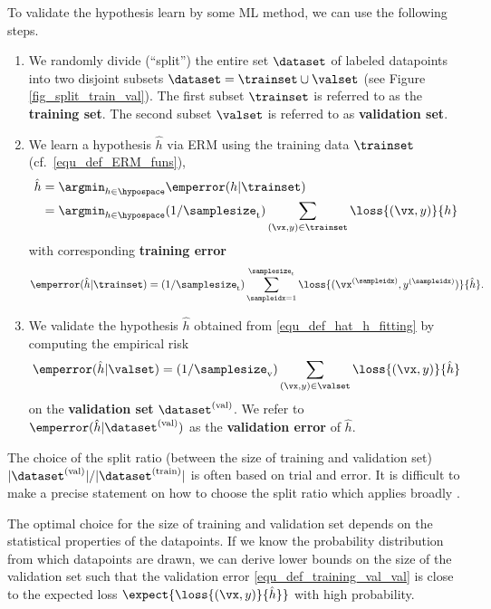 \documentclass[12pt]{report}
\begin{document}
To validate the hypothesis learn by some ML method, we can use the 
following steps. 
\begin{enumerate} 
\item We randomly divide (``split'') the entire set $\dataset$ of labeled datapoints into 
two disjoint subsets $\dataset = \trainset \cup \valset$ (see Figure \ref{fig_split_train_val}). 
The first subset $\trainset$ is referred to as the {\bf training set}. The second subset $\valset$ 
is referred to as {\bf validation set}.  
\item We learn a hypothesis $\hat{h}$ via ERM using the training data $\trainset$ (cf.\ \eqref{equ_def_ERM_funs}), 
\begin{align} 
\label{equ_def_hat_h_fitting}
\hat{h} & = \argmin_{h \in \hypospace} \emperror(h| \trainset) \nonumber \\
& = \argmin_{h \in \hypospace}  (1/\samplesize_{\rm t}) \sum_{(\vx,y) \in \trainset} \loss{(\vx,y)}{h} %
\end{align} 
with corresponding {\bf training error} 
\begin{equation} 
\label{equ_def_training_error_val}
\emperror(\hat{h}|\trainset)=  (1/\samplesize_{\rm t}) \sum_{\sampleidx=1}^{\samplesize_{\rm t}} \loss{(\vx^{(\sampleidx)},y^{(\sampleidx)})} {\hat{h}}.  %
\end{equation}  
\item We validate the hypothesis $\hat{h}$ obtained from \eqref{equ_def_hat_h_fitting} by computing the empirical risk 
\begin{equation} 
\label{equ_def_training_val_val}
\emperror(\hat{h}|\valset) = (1/\samplesize_{\rm v})  \sum_{(\vx,y) \in \valset} \loss{(\vx,y)} {\hat{h}}  %
\end{equation}  
on the {\bf validation set} $\dataset^{(\rm val)}$. We refer to $\emperror(\hat{h}| \dataset^{(\rm val)})$ 
as the {\bf validation error} of $\hat{h}$. 
\end{enumerate} 
The choice of the split ratio (between the size of training and validation set) $|\dataset^{(\rm val)}| / |\dataset^{(\rm train)}|$ 
is often based on trial and error. It is difficult to make a precise statement on 
how to choose the split ratio which applies broadly \cite{Larsen1999}. 

The optimal choice for the size of training and validation set depends on the 
statistical properties of the datapoints. If we know the probability distribution 
from which datapoints are drawn, we can derive lower bounds on the size of 
the validation set such that the validation error \eqref{equ_def_training_val_val} 
is close to the expected loss $\expect\{ \loss{(\vx,y)} {\hat{h}} \}$ with high probability. 
 
\end{document}
